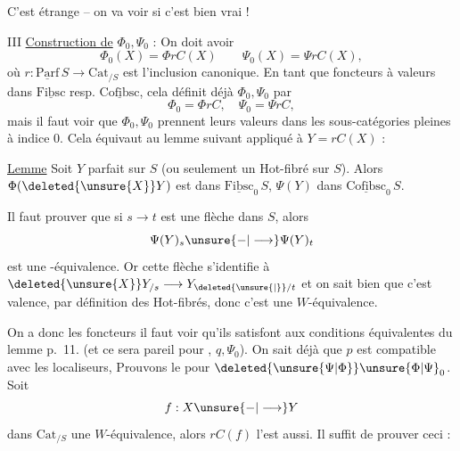 C'est  étrange -- on va voir si c'est bien vrai !

III \uline{Construction de} $\Phi_0,\Psi_0$ :
On doit avoir
\[
\Phi_0(X)=\Phi r C(X)\qquad \Psi_0(X)=\Psi r C(X),
\]
où   $r:\underline{\mathrm{Parf}}\,S\longrightarrow\mathrm{Cat}_{/S}$ est l'inclusion canonique. En tant que foncteurs à valeurs dans $\underline{\mathrm{Fibsc}}$ resp. $\underline{\mathrm{Cofibsc}}$, cela définit déjà $\Phi_0,\Psi_0$ par
\[
\Phi_0=\Phi r C,\quad \Psi_0=\Psi r C,
\]
mais il faut voir que $\Phi_0,\Psi_0$ prennent leurs valeurs dans les sous-catégories pleines à indice $0$.  Cela équivaut  au lemme suivant \unsure{,|;} appliqué à $Y=rC(X)$ :

\uline{Lemme} Soit $Y$ parfait sur $S$ (ou seulement un Hot-fibré sur $S$). Alors $\Phi(\deleted{\unsure{X}}Y)$ est dans $\underline{\mathrm{Fibsc}}_0\,S$, $\Psi(Y)$ dans $\underline{\mathrm{Cofibsc}}_0\,S$.

Il faut prouver  que si  $s\longrightarrow t$ est une flèche dans $S$, alors
\[
\Psi(Y)_s\unsure{\mathord{-}|\longrightarrow}\Psi(Y)_t
\]
est une -équivalence. Or cette flèche s'identifie à $\deleted{\unsure{X}}Y_{/s}\longrightarrow Y_{\deleted{\unsure{\vert}}/t}$ et on sait bien que c'est  %
%
valence, par définition des Hot-fibrés, donc c'est une $W$-équivalence.

On a donc les foncteurs
il faut voir qu'ils satisfont aux conditions équivalentes du lemme p.~11. (et ce sera pareil pour , $q,\Psi_0$). On sait déjà que $p$ est compatible avec les localiseurs, 
 Prouvons le pour $\deleted{\unsure{\Psi|\Phi}}\unsure{\Phi|\Psi}_0$. Soit
\[
 f:X\unsure{\mathord{-}|\longrightarrow}Y
\]
dans $\mathrm{Cat}_{/S}$ une $W$-équivalence, alors $rC(f)$ l'est aussi. Il suffit de prouver ceci :

